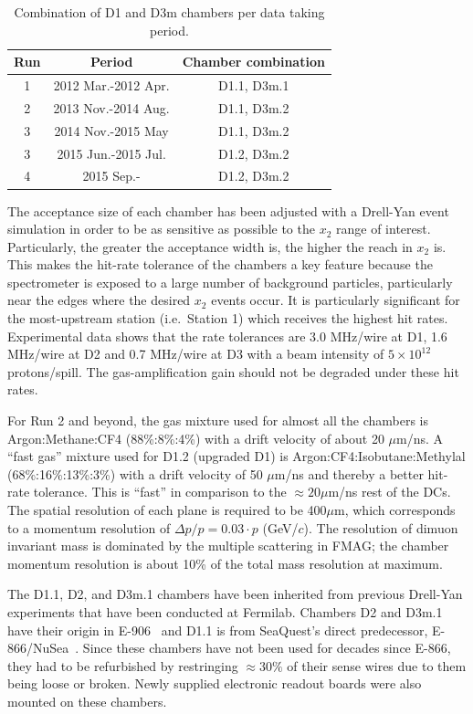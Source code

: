 \begin{table}[bthp]\centering
	\begin{tabular}{ccc}
		\hline
		Run & Period & Chamber combination \\
		\hline
		1 & 2012 Mar.-2012 Apr.  &  D1.1, D3m.1 \\
		2 & 2013 Nov.-2014 Aug.  &  D1.1, D3m.2 \\
		3 & 2014 Nov.-2015 May   &  D1.1, D3m.2 \\
		3 & 2015 Jun.-2015 Jul.  &  D1.2, D3m.2 \\
		4 & 2015 Sep.-   &  D1.2, D3m.2 \\
		\hline
	\end{tabular}
	\caption{Combination of D1 and D3m chambers per data taking period.}
	\label{tab:cham:comb1}
\end{table}

The acceptance size of each chamber has been adjusted with a Drell-Yan event simulation in order to be as sensitive as possible to the $x_2$ range of interest. Particularly, the greater the acceptance width is, the higher the reach in $x_2$ is. This makes the hit-rate tolerance of the chambers a key feature because the spectrometer is exposed to a large number of background particles, particularly near the edges where the desired $x_2$ events occur. It is particularly significant for the most-upstream station (i.e.~Station 1) which receives the highest hit rates. Experimental data shows that the rate tolerances are 3.0 MHz/wire at D1, 1.6 MHz/wire at D2 and 0.7 MHz/wire at D3 with a beam intensity of $5\times 10^{12}$ protons/spill. The gas-amplification gain should not be degraded under these hit rates.

For Run 2 and beyond, the gas mixture used for almost all the chambers is Argon:Methane:CF4 (88\%:8\%:4\%) with a drift velocity of about 20 $\mu$m/ns. A ``fast gas'' mixture used for D1.2 (upgraded D1) is Argon:CF4:Isobutane:Methylal (68\%:16\%:13\%:3\%) with a drift velocity of 50 $\mu$m/ns and thereby a better hit-rate tolerance. This is ``fast'' in comparison to the $\approx 20\mu$m/ns rest of the DCs. The spatial resolution of each plane is required to be 400$\mu$m, which corresponds to a momentum resolution of $\Delta p / p = 0.03 \cdot p$ (GeV/$c$). The resolution of dimuon invariant mass is dominated by the multiple scattering in FMAG; the chamber momentum resolution is about 10\% of the total mass resolution at maximum.

The D1.1, D2, and D3m.1 chambers have been inherited from previous Drell-Yan experiments that have been conducted at Fermilab.
Chambers D2 and D3m.1 have their origin in E-906~\cite{PhysRevD.43.2815} and D1.1 is from SeaQuest's direct predecessor, E-866/NuSea~\cite{PhysRevLett.80.3715, Towell:2001nh}. Since these chambers have not been used for decades since E-866, they had to be refurbished by restringing $\approx 30\%$ of their sense wires due to them being loose or broken. Newly supplied electronic readout boards were also mounted on these chambers.

